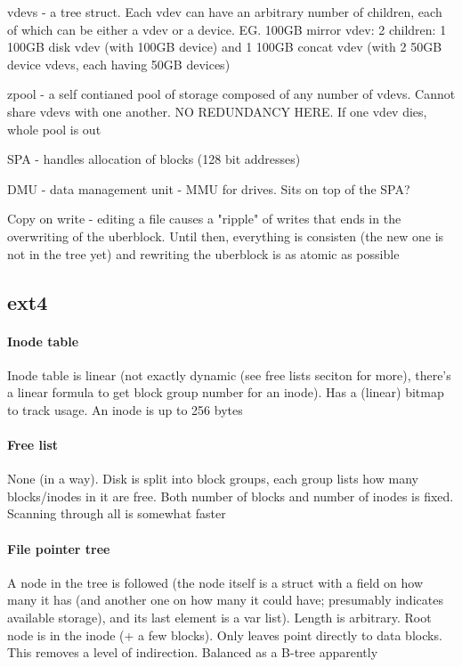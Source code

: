 \documentclass[a4paper]{report}
\begin{document}
        vdevs - a tree struct. Each vdev can have an arbitrary number of
        children, each of which can be either a vdev or a device. EG. 100GB
        mirror vdev: 2 children: 1 100GB disk vdev (with 100GB device) and 1
        100GB concat vdev (with 2 50GB device vdevs, each having 50GB devices)

        zpool - a self contianed pool of storage composed of any number of
        vdevs. Cannot share vdevs with one another. NO REDUNDANCY HERE. If one
        vdev dies, whole pool is out

        SPA - handles allocation of blocks (128 bit addresses)

        DMU - data management unit - MMU for drives. Sits on top of the SPA?

        Copy on write - editing a file causes a "ripple" of writes that ends in
        the overwriting of the uberblock. Until then, everything is consisten
        (the new one is not in the tree yet) and rewriting the uberblock is as
        atomic as possible

    \subsection{ext4}

        \paragraph{Inode table} Inode table is linear (not exactly dynamic (see
        free lists seciton for more), there's a linear formula to get block
        group number for an inode). Has a (linear) bitmap to track usage.  An
        inode is up to 256 bytes

        \paragraph{Free list} None (in a way). Disk is split into block groups,
        each group lists how many blocks/inodes in it are free. Both number of
        blocks and number of inodes is fixed. Scanning through all is somewhat
        faster


        \paragraph{File pointer tree} A node in the tree is followed (the node
        itself is a struct with a field on how many it has (and another one on
        how many it could have; presumably indicates available storage), and
        its last element is a var list). Length is arbitrary. Root node is in
        the inode (+ a few blocks). Only leaves point directly to data blocks.
        This removes a level of indirection. Balanced as a B-tree apparently
\end{document}
